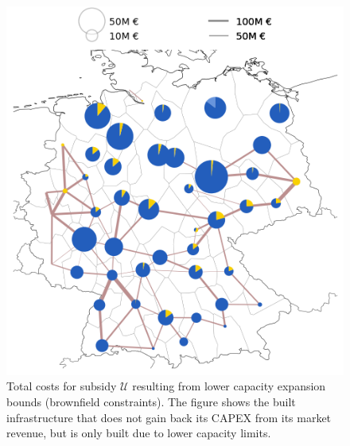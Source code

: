 \documentclass[11pt,twocolumn]{article}
\newcommand{\subsidycost}{\mathcal{U}}
\begin{document}
\begin{figure}
    \vspace{2cm}
    \includegraphics[width=\linewidth]{de50/subsidy}
    \caption{Total costs for subsidy $\subsidycost$ resulting from lower capacity expansion bounds (brownfield constraints). The figure shows the built infrastructure that does not gain back its CAPEX from its market revenue, but is only built due to lower capacity limits.}
    \label{fig:subsidy}
\end{figure}


\end{document}
